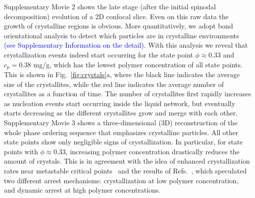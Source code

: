 \documentclass[preprint,amsmath,amssymb,superscriptaddress]{revtex4-1}
\begin{document}
Supplementary Movie 2 shows the late stage (after the initial spinodal decomposition) evolution of a 2D confocal slice. Even on this raw data the growth of crystalline regions is obvious. More quantitatively, we adopt bond orientational analysis to detect which particles are in crystalline environments~\cite{russo2013interplay} 
\textcolor{blue}{(see Supplementary Information on the detail)}. 
With this analysis we reveal that crystallization events indeed start occurring for the state point $\phi\approx 0.33$ and $c_p=0.38$ mg/g, which has the lowest
polymer concentration of all state points. This is shown in Fig.~\ref{fig:crystals}a, where the black line indicates the average size of the crystallites, 
while the red line indicates the average number of crystallites as a function of time. The number of crystallites first rapidly increases as nucleation events
start occurring inside the liquid network, but eventually starts decreasing as the different crystallites grow and merge with each other.  Supplementary Movie 3 shows a three-dimensional (3D) reconstruction  of the whole phase ordering sequence that emphasizes crystalline particles.
All other state points show only negligible signs of crystallization. In particular, for state points with $\phi\approx 0.33$, increasing
polymer concentration drastically reduces the amount of crystals. This is in agreement with the
idea of enhanced crystallization rates near metastable critical points~\cite{ten1997enhancement,olmsted1998spinodal} and the
results of Refs.~\cite{soga1999metastable,fortini2008crystallization,perez2011pathways},
which speculated two different arrest mechanisms: crystallization at low polymer concentration, and dynamic arrest at high polymer concentrations.
\end{document}
